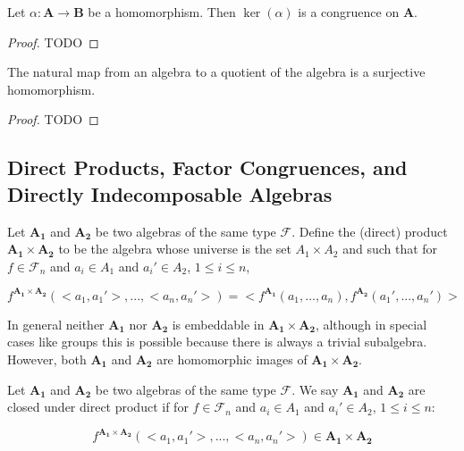 \begin{theorem}
	Let $\alpha: \boldsymbol{A} \rightarrow \boldsymbol{B}$ be a homomorphism. Then $\ker(\alpha)$ is a congruence on $\boldsymbol{A}$.
\end{theorem}

\begin{proof}
	TODO
\end{proof}

\begin{theorem}
	The natural map from an algebra to a quotient of the algebra is a surjective homomorphism.
\end{theorem}

\begin{proof}
	TODO
\end{proof}


\subsection{Direct Products, Factor Congruences, and Directly Indecomposable
Algebras}

\begin{definition}
	Let $\boldsymbol{A_1}$ and $\boldsymbol{A_2}$ be two algebras of the same type $\mathcal{F}$. Define the (direct) product $\boldsymbol{A_1} \times \boldsymbol{A_2}$ to be the algebra whose universe is the set $A_1 \times A_2$ and such that for $f \in \mathcal{F}_n$ and $a_i \in A_1$ and $a_i' \in A_2$, $1 \leq i \leq n$,

	\begin{equation}
	f^{\boldsymbol{A_1} \times \boldsymbol{A_2}} (<a_1, a_1'>, ..., <a_n, a_n'>) = <f^{\boldsymbol{A_1}} (a_1, ..., a_n), f^{\boldsymbol{A_2}}(a_1', ..., a_n') >
	\end{equation}
\end{definition}

\begin{remark}
	In general neither $\boldsymbol{A_1}$ nor $\boldsymbol{A_2}$ is embeddable in $\boldsymbol{A_1} \times \boldsymbol{A_2}$, although in special cases like groups this is possible because there is always a trivial subalgebra. However, both $\boldsymbol{A_1}$ and $\boldsymbol{A_2}$ are homomorphic images of $\boldsymbol{A_1} \times \boldsymbol{A_2}$.
\end{remark}

\begin{definition}
	Let $\boldsymbol{A_1}$ and $\boldsymbol{A_2}$ be two algebras of the same type $\mathcal{F}$. We say $\boldsymbol{A_1}$ and $\boldsymbol{A_2}$ are closed under direct product if for $f \in \mathcal{F}_n$ and $a_i \in A_1$ and $a_i' \in A_2$, $1 \leq i \leq n$:

	\begin{equation}
	f^{\boldsymbol{A_1} \times \boldsymbol{A_2}} (<a_1, a_1'>, ..., <a_n, a_n'>) \in \boldsymbol{A_1} \times \boldsymbol{A_2}
	\end{equation}
\end{definition}

